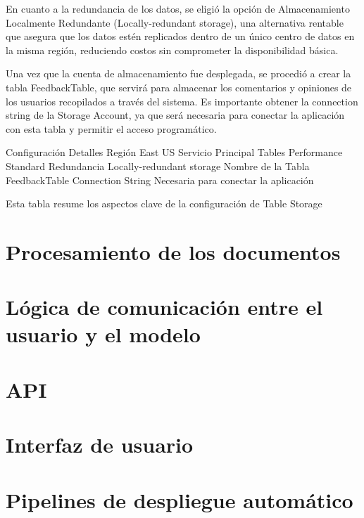 En cuanto a la redundancia de los datos, se eligió la opción de Almacenamiento Localmente Redundante (Locally-redundant storage), una alternativa rentable que asegura que los datos estén replicados dentro de un único centro de datos en la misma región, reduciendo costos sin comprometer la disponibilidad básica.

Una vez que la cuenta de almacenamiento fue desplegada, se procedió a crear la tabla FeedbackTable, que servirá para almacenar los comentarios y opiniones de los usuarios recopilados a través del sistema. Es importante obtener la connection string de la Storage Account, ya que será necesaria para conectar la aplicación con esta tabla y permitir el acceso programático.

Configuración	Detalles
Región	East US
Servicio Principal	Tables
Performance	Standard
Redundancia	Locally-redundant storage
Nombre de la Tabla	FeedbackTable
Connection String	Necesaria para conectar la aplicación

Esta tabla resume los aspectos clave de la configuración de Table Storage

\section{Procesamiento de los documentos}

\section{Lógica de comunicación entre el usuario y el modelo}

\section{API}

\section{Interfaz de usuario}

\section{Pipelines de despliegue automático}